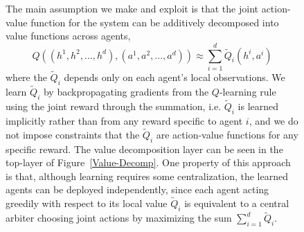 \documentclass{article}
\begin{document}
\begin{figure}
The main assumption we make and exploit is that the joint action-value function for the system can be additively decomposed into value functions across agents,
$$%
Q((h^1,h^2,...,h^d),(a^1,a^2,...,a^d))\approx \sum_{i=1}^d \tilde Q_i(h^i,a^i)\label{Qsum}
$$%
where the $\tilde Q_i$ depends only on each agent's local observations. We learn $\tilde Q_i$ by backpropagating gradients from the $Q$-learning rule using the joint reward through the summation, i.e. $\tilde Q_i$ is learned implicitly rather than from any reward specific to agent $i$, and we do not impose constraints that the $\tilde Q_i$ are action-value functions for any specific reward. The value decomposition layer can be seen in the top-layer of Figure~\ref{Value-Decomp}. One property of this approach is that, although learning requires some centralization, the learned agents can be deployed independently, since each agent acting greedily with respect to its local value $\tilde Q_i$ is equivalent to a central arbiter choosing joint actions by maximizing the sum $\sum_{i=1}^d \tilde Q_i$.




\end{figure}
\end{document}
